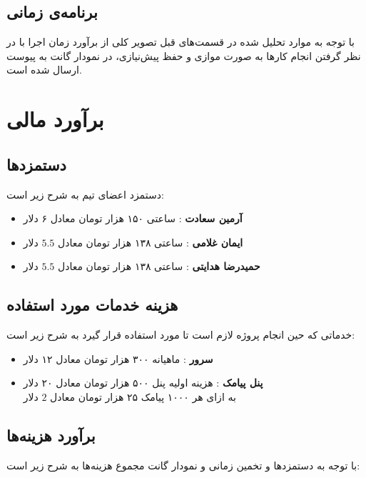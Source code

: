 \renewcommand{\arraystretch}{1.7}

\subsection{برنامه‌ی زمانی}
با توجه به موارد تحلیل شده در قسمت‌های قبل تصویر کلی از برآورد زمان اجرا با در نظر گرفتن انجام کار‌ها به صورت موازی و حفظ پیش‌نیازی، در نمودار گانت
به پیوست ارسال شده است.

\section{برآورد مالی}
\subsection{دستمزدها}
دستمزد اعضای تیم به شرح زیر است:
\begin{itemize}
	\item 
	\textbf{آرمین سعادت}
	: ساعتی ۱۵۰ هزار تومان معادل ۶ دلار
	\item 
	\textbf{ایمان غلامی}
	: ساعتی ۱۳۸ هزار تومان معادل 
	$5.5$
	دلار
	\item 
	\textbf{حمیدرضا هدایتی}
	: ساعتی ۱۳۸ هزار تومان معادل 
	$5.5$
	دلار
\end{itemize}

\subsection{هزینه خدمات مورد استفاده}
خدماتی که حین انجام پروژه لازم است تا مورد استفاده قرار گیرد به شرح زیر است:
\begin{itemize}
	\item 
	\textbf{سرور}
	: ماهیانه ۳۰۰ هزار تومان معادل ۱۲ دلار
	\item 
	\textbf{پنل پیامک}
	:
	هزینه اولیه پنل ۵۰۰ هزار تومان معادل ۲۰ دلار
	\\
	به ازای هر ۱۰۰۰ پیامک ۲۵ هزار تومان معادل 
	$2$
	دلار

\end{itemize}

\subsection{برآورد هزینه‌ها}
با توجه به دستمزد‌ها و تخمین زمانی و نمودار گانت مجموع هزینه‌ها به شرح زیر است:

